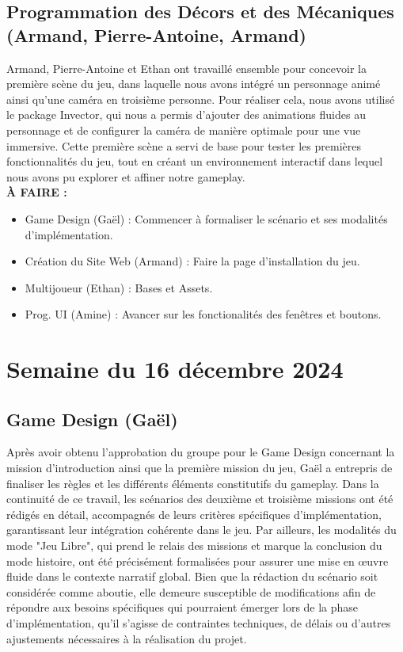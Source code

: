 \documentclass{report}
\begin{document}
\subsection*{Programmation des Décors et des Mécaniques (Armand, Pierre-Antoine, Armand)}
Armand, Pierre-Antoine et Ethan ont travaillé ensemble pour concevoir la première scène du jeu, dans laquelle nous avons intégré un personnage animé ainsi qu'une caméra en troisième personne. Pour réaliser cela, nous avons utilisé le package Invector, qui nous a permis d'ajouter des animations fluides au personnage et de configurer la caméra de manière optimale pour une vue immersive. Cette première scène a servi de base pour tester les premières fonctionnalités du jeu, tout en créant un environnement interactif dans lequel nous avons pu explorer et affiner notre gameplay.
\\[1cm]
\textbf{À FAIRE :}
\begin{itemize}
    \item Game Design (Gaël) : Commencer à formaliser le scénario et ses modalités d'implémentation.
    \item Création du Site Web (Armand) : Faire la page d'installation du jeu.
    \item Multijoueur (Ethan) : Bases et Assets.
    \item Prog. UI (Amine) : Avancer sur les fonctionalités des fenêtres et boutons.
\end{itemize}






\newpage
\section{Semaine du 16 décembre 2024}

\subsection*{Game Design (Gaël)}
Après avoir obtenu l'approbation du groupe pour le Game Design concernant la mission d'introduction ainsi que la première mission du jeu, Gaël a entrepris de finaliser les règles et les différents éléments constitutifs du gameplay. Dans la continuité de ce travail, les scénarios des deuxième et troisième missions ont été rédigés en détail, accompagnés de leurs critères spécifiques d'implémentation, garantissant leur intégration cohérente dans le jeu. Par ailleurs, les modalités du mode "Jeu Libre", qui prend le relais des missions et marque la conclusion du mode histoire, ont été précisément formalisées pour assurer une mise en œuvre fluide dans le contexte narratif global. Bien que la rédaction du scénario soit considérée comme aboutie, elle demeure susceptible de modifications afin de répondre aux besoins spécifiques qui pourraient émerger lors de la phase d'implémentation, qu'il s'agisse de contraintes techniques, de délais ou d'autres ajustements nécessaires à la réalisation du projet.
\end{document}
